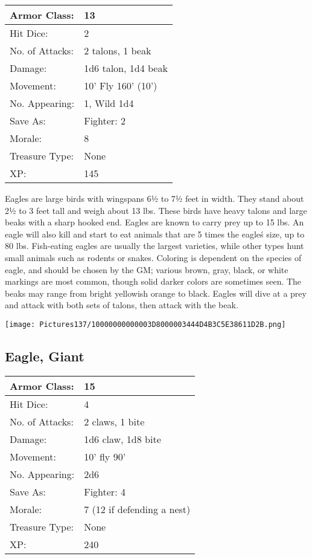 \documentclass[a4paper,twoside,openany,10pt]{book}
\begin{document}
\begin{multicols}{2}
\begin{tabularx}{0.48\textwidth}{@{}lX@{}}
Armor Class: & 13 \\\hline
Hit Dice: & 2 \\\hline
No. of Attacks: & 2 talons, 1 beak \\\hline
Damage: & 1d6 talon, 1d4 beak \\\hline
Movement: & 10' Fly 160' (10') \\\hline
No. Appearing: & 1, Wild 1d4 \\\hline
Save As: & Fighter: 2 \\\hline
Morale: & 8 \\\hline
Treasure Type: & None \\\hline
XP: & 145 \\\hline
\end{tabularx}\medskip

Eagles are large birds with wingspans 6½ to 7½ feet in width. They stand about 2½ to 3 feet tall and weigh about 13 lbs. These birds have heavy talons and large beaks with a sharp hooked end. Eagles are known to carry prey up to 15 lbs. An eagle will also kill and start to eat animals that are 5 times the eagle\'s size, up to 80 lbs. Fish-eating eagles are usually the largest varieties, while other types hunt small animals such as rodents or snakes. Coloring is dependent on the species of eagle, and should be chosen by the GM; various brown, gray, black, or white markings are most common, though solid darker colors are sometimes seen. The beaks may range from bright yellowish orange to black. Eagles will dive at a prey and attack with both sets of talons, then attack with the beak.

\begin{center}
	\texttt{[image: Pictures137/10000000000003D8000003444D4B3C5E38611D2B.png]}
\end{center}

\subsection*{Eagle, Giant}\label{eagle-giant}

\begin{tabularx}{0.48\textwidth}{@{}lX@{}}
Armor Class: & 15 \\\hline
Hit Dice: & 4 \\\hline
No. of Attacks: & 2 claws, 1 bite \\\hline
Damage: & 1d6 claw, 1d8 bite \\\hline
Movement: & 10' fly 90' \\\hline
No. Appearing: & 2d6 \\\hline
Save As: & Fighter: 4 \\\hline
Morale: & 7 (12 if defending a nest) \\\hline
Treasure Type: & None \\\hline
XP: & 240 \\\hline
\end{tabularx}\medskip


\end{multicols}
\end{document}
